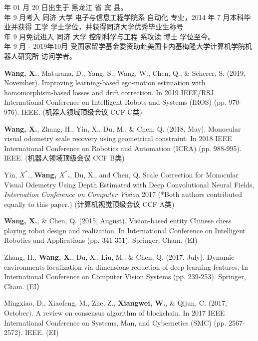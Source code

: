  年 01 月 20 日出生于 黑龙江 省 宾 县。\\
 年 9 月考入 同济 大学 电子与信息工程学院系 自动化 专业，2014 年 7 月本科毕业并获得 工学 学士学位，并获得同济大学优秀毕业生称号\\
 年 9 月免试进入 同济 大学 控制科学与工程 系攻读 博士 学位至今。\\
 年 9 月 - 2019年10月 受国家留学基金委资助赴美国卡内基梅隆大学计算机学院机器人研究所 访问学者。

\begin{enumerate}[{[}1{]}]
\item \textbf{Wang, X.}, Maturana, D., Yang, S., Wang, W., Chen, Q., \& Scherer, S. (2019, November).
 Improving learning-based ego-motion estimation with homomorphism-based losses and drift correction. 
 In 2019 IEEE/RSJ International Conference on Intelligent Robots and Systems (IROS) (pp. 970-976). IEEE. (机器人领域顶级会议 CCF C类)
\item \textbf{Wang, X.}, Zhang, H., Yin, X., Du, M., \& Chen, Q. (2018, May). 
Monocular visual odometry scale recovery using geometrical constraint. 
In 2018 IEEE International Conference on Robotics and Automation (ICRA) (pp. 988-995). IEEE. (机器人领域顶级会议 CCF B类)
\item Yin, $X^*$., {\bf Wang, $X^*$.}, Du, X., and Chen, Q. 
Scale Correction for Monocular Visual Odemetry Using Depth Estimated with Deep Convolutional Neural Fields,
 \emph{Internation Conference on Computer Vision} 2017 (*Both authors contributed equally to this paper.)
 (计算机视觉顶级会议 CCF A类)
\item \textbf{Wang, X.}, \& Chen, Q. (2015, August).
 Vision-based entity Chinese chess playing robot design and realization. 
 In International Conference on Intelligent Robotics and Applications (pp. 341-351). Springer, Cham. (EI)
 \item Zhang, H., \textbf{Wang, X.}, Du, X., Liu, M., \& Chen, Q. (2017, July). 
 Dynamic environments localization via dimensions reduction of deep learning features.
  In International Conference on Computer Vision Systems (pp. 239-253). Springer, Cham. (EI）
\item Mingxiao, D., Xiaofeng, M., Zhe, Z., \textbf{Xiangwei, W.}, \& Qijun, C. (2017, October).
 A review on consensus algorithm of blockchain. 
 In 2017 IEEE International Conference on Systems, Man, and Cybernetics (SMC) (pp. 2567-2572). IEEE. (EI)
\end{enumerate}

